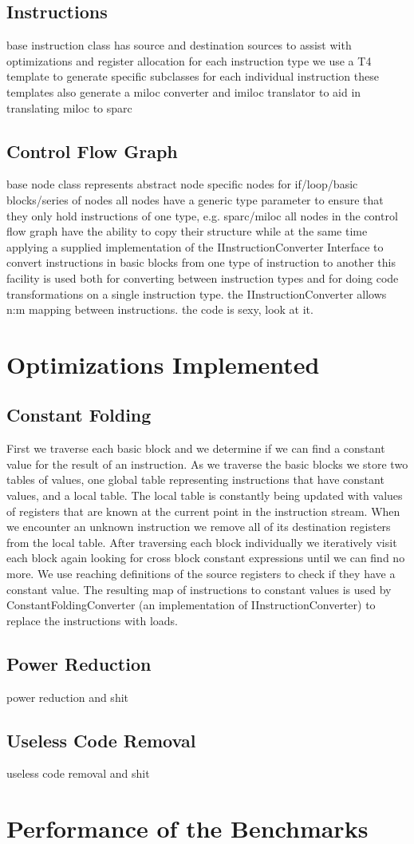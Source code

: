 \documentclass[12pt]{article}
\begin{document}
\subsection{Instructions}
base instruction class has source and destination sources to assist with optimizations and register allocation
for each instruction type we use a T4 template to generate specific subclasses for each individual instruction
these templates also generate a miloc converter and imiloc translator to aid in translating miloc to sparc

\subsection{Control Flow Graph}
base node class represents abstract node
specific nodes for if/loop/basic blocks/series of nodes
all nodes have a generic type parameter to ensure that they only hold instructions of one type, e.g. sparc/miloc
all nodes in the control flow graph have the ability to copy their structure while at the same time applying a supplied implementation of the IInstructionConverter Interface to convert instructions in basic blocks from one type of instruction to another
this facility is used both for converting between instruction types and for doing code transformations on a single instruction type.
the IInstructionConverter allows n:m mapping between instructions. the code is sexy, look at it.

\section{Optimizations Implemented}

\subsection{Constant Folding}
First we traverse each basic block and we determine if we can find a constant value for the result of an instruction.
As we traverse the basic blocks we store two tables of values, one global table representing instructions that have constant values, and a local table.
The local table is constantly being updated with values of registers that are known at the current point in the instruction stream.
When we encounter an unknown instruction we remove all of its destination registers from the local table.
After traversing each block individually we iteratively visit each block again looking for cross block constant expressions until we can find no more.
We use reaching definitions of the source registers to check if they have a constant value.
The resulting map of instructions to constant values is used by ConstantFoldingConverter (an implementation of IInstructionConverter) to replace the instructions with loads.
\subsection{Power Reduction}
power reduction and shit
\subsection{Useless Code Removal}
useless code removal and shit
\section{Performance of the Benchmarks}
  
\end{document}
